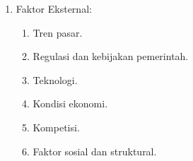 \begin{enumerate}
\begin{enumerate}
\begin{enumerate}
    \item Kultur perusahaan.
    \item Visi dan misi.
    \end{enumerate}
  \item Faktor Eksternal:
    \begin{enumerate}
    \item Tren pasar.
    \item Regulasi dan kebijakan pemerintah.
    \item Teknologi.
    \item Kondisi ekonomi.
    \item Kompetisi.
    \item Faktor sosial dan struktural.
    \end{enumerate}
  \end{enumerate}
\end{enumerate}
